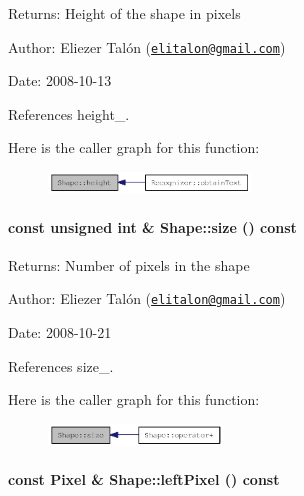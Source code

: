 \begin{Desc}
\item[Returns:]Height of the shape in pixels\end{Desc}
\begin{Desc}
\item[Author:]Eliezer Talón (\href{mailto:elitalon@gmail.com}{\tt elitalon@gmail.com}) \end{Desc}
\begin{Desc}
\item[Date:]2008-10-13 \end{Desc}


References height\_\-.

Here is the caller graph for this function:\nopagebreak
\begin{figure}[H]
\begin{center}
\leavevmode
\includegraphics[width=152pt]{class_shape_8400155046b2190bce621f8f366ef2be_icgraph}
\end{center}
\end{figure}
\hypertarget{class_shape_8504d3be338d2fa594c35fe1444a9ed8}{
\paragraph[size]{\setlength{\rightskip}{0pt plus 5cm}const unsigned int \& Shape::size () const}\hfill}
\label{class_shape_8504d3be338d2fa594c35fe1444a9ed8}


\begin{Desc}
\item[Returns:]Number of pixels in the shape\end{Desc}
\begin{Desc}
\item[Author:]Eliezer Talón (\href{mailto:elitalon@gmail.com}{\tt elitalon@gmail.com}) \end{Desc}
\begin{Desc}
\item[Date:]2008-10-21 \end{Desc}


References size\_\-.

Here is the caller graph for this function:\nopagebreak
\begin{figure}[H]
\begin{center}
\leavevmode
\includegraphics[width=131pt]{class_shape_8504d3be338d2fa594c35fe1444a9ed8_icgraph}
\end{center}
\end{figure}
\hypertarget{class_shape_53d49d362234068aad0b80986fabb85d}{
\paragraph[leftPixel]{\setlength{\rightskip}{0pt plus 5cm}const {\bf Pixel} \& Shape::leftPixel () const}\hfill}
\label{class_shape_53d49d362234068aad0b80986fabb85d}


